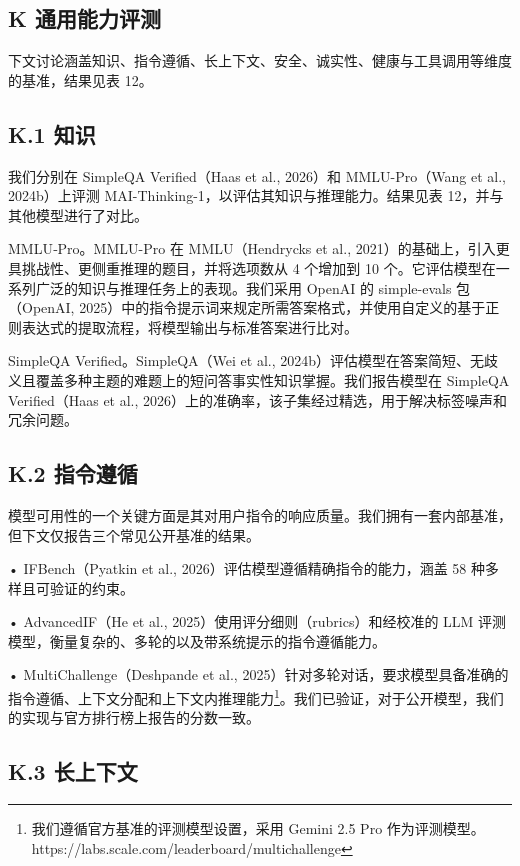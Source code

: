 \subsection{K 通用能力评测}\label{k-general-capabilities-evaluations}

下文讨论涵盖知识、指令遵循、长上下文、安全、诚实性、健康与工具调用等维度的基准，结果见表 12。

\subsection{K.1 知识}\label{k.1-knowledge}

我们分别在 SimpleQA Verified（Haas et al., 2026）和 MMLU-Pro（Wang et al., 2024b）上评测 MAI-Thinking-1，以评估其知识与推理能力。结果见表 12，并与其他模型进行了对比。

MMLU‐Pro。MMLU-Pro 在 MMLU（Hendrycks et al., 2021）的基础上，引入更具挑战性、更侧重推理的题目，并将选项数从 4 个增加到 10 个。它评估模型在一系列广泛的知识与推理任务上的表现。我们采用 OpenAI 的 simple-evals 包（OpenAI, 2025）中的指令提示词来规定所需答案格式，并使用自定义的基于正则表达式的提取流程，将模型输出与标准答案进行比对。

SimpleQA Verified。SimpleQA（Wei et al., 2024b）评估模型在答案简短、无歧义且覆盖多种主题的难题上的短问答事实性知识掌握。我们报告模型在 SimpleQA Verified（Haas et al., 2026）上的准确率，该子集经过精选，用于解决标签噪声和冗余问题。

\subsection{K.2 指令遵循}\label{k.2-instruction-following}

模型可用性的一个关键方面是其对用户指令的响应质量。我们拥有一套内部基准，但下文仅报告三个常见公开基准的结果。

• IFBench（Pyatkin et al., 2026）评估模型遵循精确指令的能力，涵盖 58 种多样且可验证的约束。

• AdvancedIF（He et al., 2025）使用评分细则（rubrics）和经校准的 LLM 评测模型，衡量复杂的、多轮的以及带系统提示的指令遵循能力。

• MultiChallenge（Deshpande et al., 2025）针对多轮对话，要求模型具备准确的指令遵循、上下文分配和上下文内推理能力\footnote{我们遵循官方基准的评测模型设置，采用 Gemini 2.5 Pro 作为评测模型。https://labs.scale.com/leaderboard/multichallenge}。我们已验证，对于公开模型，我们的实现与官方排行榜上报告的分数一致。

\subsection{K.3 长上下文}\label{k.3-long-context}

